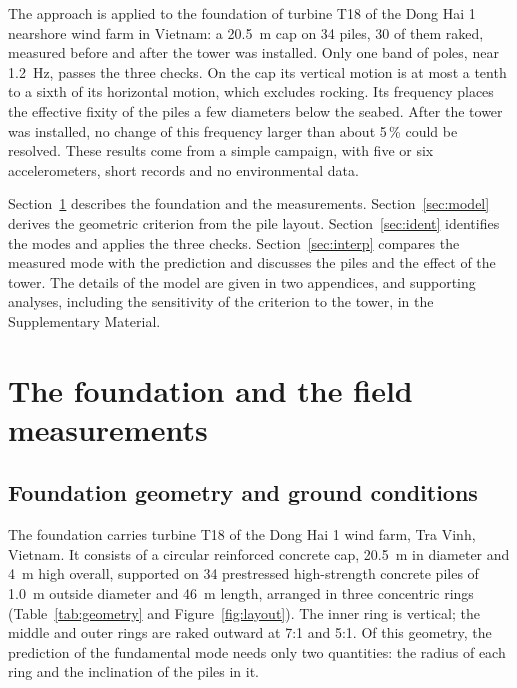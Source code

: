 \documentclass[11pt]{article}
\begin{document}
The approach is applied to the foundation of turbine T18 of the Dong Hai 1 nearshore wind farm in Vietnam: a 20.5~m cap on 34 piles, 30 of them raked, measured before and after the tower was installed. Only one band of poles, near 1.2~Hz, passes the three checks. On the cap its vertical motion is at most a tenth to a sixth of its horizontal motion, which excludes rocking. Its frequency places the effective fixity of the piles a few diameters below the seabed. After the tower was installed, no change of this frequency larger than about 5\,\% could be resolved. These results come from a simple campaign, with five or six accelerometers, short records and no environmental data.

Section~\ref{sec:structure} describes the foundation and the measurements. Section~\ref{sec:model} derives the geometric criterion from the pile layout. Section~\ref{sec:ident} identifies the modes and applies the three checks. Section~\ref{sec:interp} compares the measured mode with the prediction and discusses the piles and the effect of the tower. The details of the model are given in two appendices, and supporting analyses, including the sensitivity of the criterion to the tower, in the Supplementary Material.

\section{The foundation and the field measurements}
\label{sec:structure}

\subsection{Foundation geometry and ground conditions} \label{sec:geometry}

The foundation carries turbine T18 of the Dong Hai 1 wind farm, Tra Vinh,
Vietnam. It consists of a circular reinforced concrete cap, 20.5~m in diameter
and 4~m high overall, supported on 34 prestressed high-strength concrete piles of 1.0~m
outside diameter and 46~m length, arranged in three concentric rings
(Table~\ref{tab:geometry} and Figure~\ref{fig:layout}). The inner ring is
vertical; the middle and outer rings are raked outward at 7:1 and 5:1. Of this
geometry, the prediction of the fundamental mode needs only two quantities: the
radius of each ring and the inclination of the piles in it.
\end{document}
